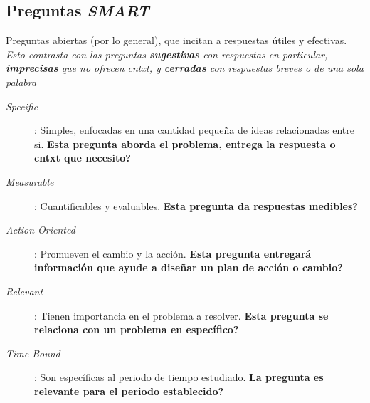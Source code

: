 \subsection{Preguntas \textit{SMART}}
Preguntas abiertas (por lo general), que incitan a respuestas útiles y efectivas. \textit{Esto contrasta con las preguntas \textbf{sugestivas} con respuestas en particular, \textbf{imprecisas} que no ofrecen \gls{cntxt}, y \textbf{cerradas} con respuestas breves o de una sola palabra}
\begin{description}
    \item [\textit{Specific}]{ : Simples, enfocadas en una cantidad pequeña de ideas relacionadas entre si. \textbf{Esta pregunta aborda el problema, entrega la respuesta o \gls{cntxt} que necesito?}}
    \item [\textit{Measurable}]{ : Cuantificables y evaluables. \textbf{Esta pregunta da respuestas medibles?}}
    \item [\textit{Action-Oriented}]{ : Promueven el cambio y la acción. \textbf{Esta pregunta entregará información que ayude a diseñar un plan de acción o cambio?}}
    \item [\textit{Relevant}]{ : Tienen importancia en el problema a resolver. \textbf{Esta pregunta se relaciona con un problema en específico?}}
    \item [\textit{Time-Bound}]{ : Son específicas al periodo de tiempo estudiado. \textbf{La pregunta es relevante para el periodo establecido?}}
\end{description}

\newpage
